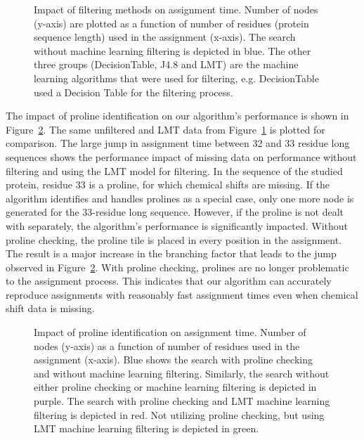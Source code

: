 \documentclass{article}
\begin{document}
\begin{figure}[H]
	\caption{Impact of filtering methods on assignment time. Number of nodes (y-axis) are plotted as a function of number of residues (protein sequence length) used in the assignment (x-axis). The search without machine learning filtering is depicted in blue. The other three groups (DecisionTable, J4.8 and LMT) are the machine learning algorithms that were used for filtering, e.g. DecisionTable used a Decision Table for the filtering process.}
	\label{fig:figure1}
	\begin{center}
		\resizebox{!}{0.6\textwidth}{}
	\end{center}
\end{figure}

The impact of proline identification on our algorithm's performance is shown in Figure~\ref{fig:figure2}. The same unfiltered and LMT data from Figure~\ref{fig:figure1} is plotted for comparison. The large jump in assignment time between 32 and 33 residue long sequences shows the performance impact of missing data on performance without filtering and using the LMT model for filtering. In the sequence of the studied protein, residue 33 is a proline, for which chemical shifts are missing. If the algorithm identifies and handles prolines as a special case, only one more node is generated for the 33-residue long sequence. However, if the proline is not dealt with separately, the algorithm's performance is significantly impacted. Without proline checking, the proline tile is placed in every position in the assignment. The result is a major increase in the branching factor that leads to the jump observed in Figure~\ref{fig:figure2}. With proline checking, prolines are no longer problematic to the assignment process. This indicates that our algorithm can accurately reproduce assignments with reasonably fast assignment times even when chemical shift data is missing. 

\begin{figure}[H]
	\caption{Impact of proline identification on assignment time. Number of nodes (y-axis) as a function of number of residues used in the assignment (x-axis). Blue shows the search with proline checking and without machine learning filtering. Similarly, the search without either proline checking or machine learning filtering is depicted in purple. The search with proline checking and LMT machine learning filtering is depicted in red. Not utilizing proline checking, but using LMT machine learning filtering is depicted in green.}
	\label{fig:figure2}
	\begin{center}
		\resizebox{!}{0.6\textwidth}{}
	\end{center}
\end{figure}
\end{document}
